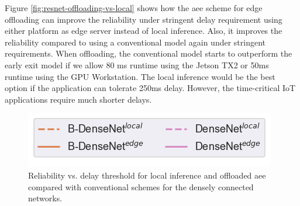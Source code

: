 Figure \ref{fig:resnet-offloading-vs-local} shows how the \gls{aee} scheme for edge offloading can improve the reliability under stringent delay requirement using either platform as edge server instead of local inference. Also, it improves the reliability compared to using a conventional model again under stringent requirements. When offloading, the conventional model starts to outperform the early exit model if we allow 80 ms runtime using the Jetson TX2 or 50ms runtime using the GPU Workstation. The local inference would be the best option if the application can tolerate 250ms delay. However, the time-critical IoT applications require much shorter delays. 
\begin{figure}
	\captionsetup[subfigure]{justification=centering, farskip=0pt,captionskip=0pt}
	\centering
	\includegraphics[width=.3\linewidth]{figures/edge/gpu_b-densenet_offloading_vs_local_legend}
	\hfill
	\hfill
	\caption[Offloading comparison of densely connected networks]{Reliability vs. delay threshold for local inference and offloaded \gls{aee} compared with conventional schemes for the densely connected networks.}
	\label{fig:densenet-offloading-vs-local}
\end{figure}

